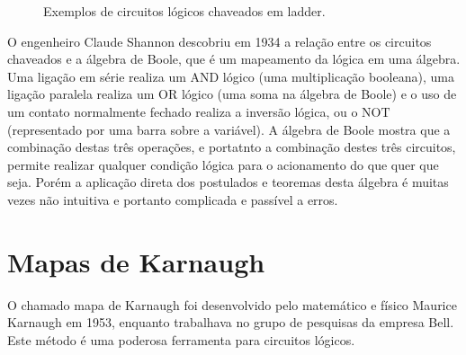 \begin{figure}[!h]
  \caption{Exemplos de circuitos lógicos chaveados em ladder.}
  \label{fig:ladders}
\end{figure}


O engenheiro Claude Shannon descobriu em 1934 a relação entre os circuitos chaveados e a álgebra de Boole, que é um mapeamento da lógica em uma álgebra. Uma ligação em série realiza um $\mathrm{AND}$ lógico (uma multiplicação booleana), uma ligação paralela realiza um $\mathrm{OR}$ lógico (uma soma na álgebra de Boole) e o uso de um contato normalmente fechado realiza a inversão lógica, ou o $\mathrm{NOT}$ (representado por uma barra sobre a variável). A álgebra de Boole mostra que a combinação destas três operações, e portatnto a combinação destes três circuitos, permite realizar qualquer condição lógica para o acionamento do que quer que seja. Porém a aplicação direta dos postulados e teoremas desta álgebra é muitas vezes não intuitiva e portanto complicada e passível a erros.

\section{Mapas de Karnaugh}

O chamado mapa de Karnaugh foi desenvolvido pelo matemático e físico Maurice Karnaugh em 1953, enquanto trabalhava no grupo de pesquisas da empresa Bell. Este método é uma poderosa ferramenta para circuitos lógicos. %

